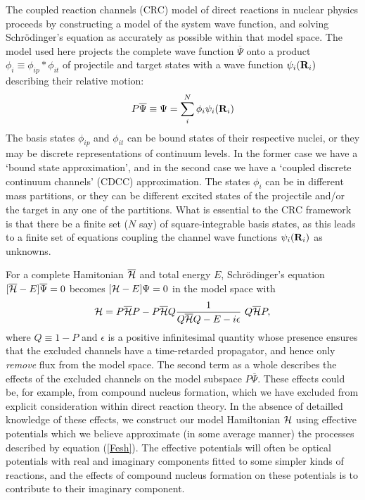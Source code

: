 \documentclass[11pt,a4paper]{article}
\newcommand{\vecR}{{\bf R}}
\begin{document}
The coupled reaction channels (CRC) model of direct reactions in nuclear
physics proceeds by constructing a model of the system wave function, and
solving Schr\"odinger's equation as accurately as possible within
that model space.  The model used here projects the complete wave function
$\overline{\Psi }$ onto a product $\phi_i \equiv\phi_{ip} *\phi_{it}$
of projectile and target states with a wave function $\psi_i (\vecR _
i)$ describing their relative motion:
\begin{eqnarray} \label{discsum}
  P\overline{\Psi } \equiv\Psi = \sum _ i ^ N \phi_i\psi_i (\vecR_i)
\end{eqnarray}
The basis states $\phi_{ip}$ and $\phi_{it}$ can be bound states
of their respective nuclei,
or they may be discrete representations of continuum levels.
In the former case we have a `bound state approximation',
and in the second case we have a `coupled discrete continuum channels'
\cite{CDCC,CDCC2} (CDCC) approximation.
The states $\phi_i$ can be in different mass partitions, or they
can be different excited states of the projectile and/or the target in any
one of the partitions.
What is essential to the CRC framework is that there be a finite set ($N$
say) of square-integrable basis states, as this leads to a finite set of
equations coupling the channel wave functions $\psi_i (\vecR _
i)$ as unknowns.

For a complete Hamitonian $\overline{{\cal H} }$ and total energy $E$,
Schr\"odinger's equation $ [ \overline{{\cal H} } - E ]\overline{\Psi } = 0$
becomes $ [ {\cal H} - E ]\Psi = 0$ in the model space with \cite{fesh58}
\begin{eqnarray} \label{Fesh}
 {\cal H} = P \overline{{\cal H} } P -
  P \overline{{\cal H} } Q {1 \over {Q \overline{{\cal H} } Q - E - i \epsilon}} ~
  Q \overline{{\cal H} } P ,
\end{eqnarray}
where $Q \equiv 1 - P$ and $\epsilon$ is a positive infinitesimal quantity whose presence ensures that
the excluded channels have a time-retarded propagator, and hence only
{\em remove} flux from the model space.
The second term as a whole describes the effects of the excluded channels on
the model subspace $ P\overline{\Psi } $.  These effects could be, for example,
from compound nucleus formation, which we have excluded from explicit
consideration within direct reaction theory.
In the absence of detailled knowledge of these effects, we construct our
model Hamiltonian ${\cal H}$ using effective potentials which we believe
approximate (in some average manner) the processes described by equation
(\ref{Fesh}). The effective potentials will often be optical potentials with
real and imaginary components fitted to some simpler kinds of reactions,
and the effects of compound nucleus formation on these potentials is to
contribute to their imaginary component.
\end{document}
